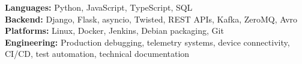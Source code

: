 

\begin{cvparagraph}
\textbf{Languages:} Python, JavaScript, TypeScript, SQL \\
\textbf{Backend:} Django, Flask, asyncio, Twisted, REST APIs, Kafka, ZeroMQ, Avro \\
\textbf{Platforms:} Linux, Docker, Jenkins, Debian packaging, Git \\
\textbf{Engineering:} Production debugging, telemetry systems, device connectivity, CI/CD, test automation, technical documentation
\end{cvparagraph}
